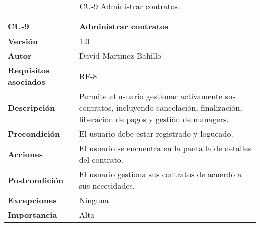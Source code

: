 \begin{table}[p]
	\centering
	\begin{tabularx}{\linewidth}{ p{} p{} }
		\toprule
		\textbf{CU-9}    & \textbf{Administrar contratos}\\
		\midrule
		\textbf{Versión}              & 1.0    \\
		\textbf{Autor}                & David Martínez Bahillo \\
		\textbf{Requisitos asociados} & RF-8 \\
		\textbf{Descripción}          & Permite al usuario gestionar activamente sus contratos, incluyendo cancelación, finalización, liberación de pagos y gestión de managers. \\
		\textbf{Precondición}         & El usuario debe estar registrado y logueado. \\
		\textbf{Acciones}             & El usuario se encuentra en la pantalla de detalles del contrato. \\
		\textbf{Postcondición}        & El usuario gestiona sus contratos de acuerdo a sus necesidades. \\
		\textbf{Excepciones}          & Ninguna \\
		\textbf{Importancia}          & Alta \\
		\bottomrule
	\end{tabularx}
	\caption{CU-9 Administrar contratos.}
\end{table}


